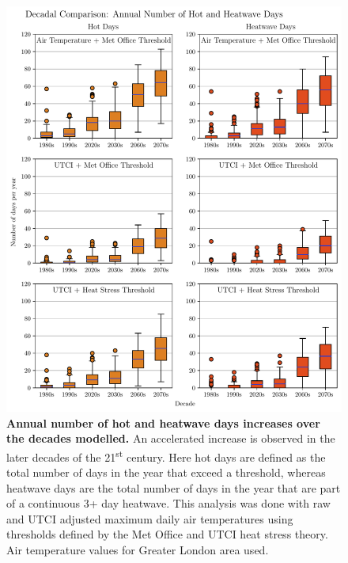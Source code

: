 \documentclass[10pt,letterpaper]{article}
\begin{document}
\pagebreak


\begin{figure}
\begin{adjustwidth}{-2.25in}{0in}
    \begin{center}
        \includegraphics[width=0.9\linewidth]{./boxplots.pdf}
    \end{center}
    \caption{
    {\bf Annual number of hot and heatwave days increases over the decades modelled.}
    An accelerated increase is observed in the later decades of the 21\textsuperscript{st} century.
    Here hot days are defined as the total number of days in the year that exceed a threshold, whereas heatwave days are the total number of days in the year that are part of a continuous 3+ day heatwave. This analysis was done with raw and UTCI adjusted maximum daily air temperatures using thresholds defined by the Met Office and UTCI heat stress theory. Air temperature values for Greater London area used.
    }
    \label{boxplots}
\end{adjustwidth}
\end{figure}
\end{document}
